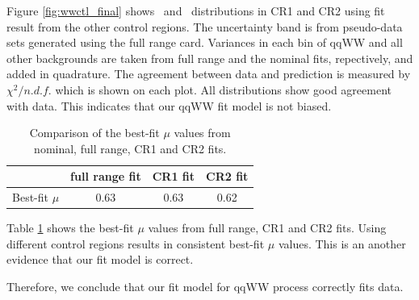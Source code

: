Figure \ref{fig:wwctl_final} shows \mt~and \mll~distributions in CR1 and CR2 using 
fit result from the other control regions. The uncertainty band is from pseudo-data 
sets generated using the full range card. Variances in each bin of qqWW and all other 
backgrounds are taken from full range and the nominal fits, repectively, and added in quadrature. 
The agreement between data and prediction is measured by $\chi^2/n.d.f.$ which is 
shown on each plot. All distributions show good agreement with data.
This indicates that our qqWW fit model is not biased.
%
\begin{table}
\begin{center}
\begin{tabular}{c|ccc}
\hline
                    & full range fit    & CR1 fit   & CR2 fit   \\
\hline
Best-fit $\mu$      & 0.63              & 0.63      & 0.62      \\
\hline
\end{tabular}
\end{center}
\caption{Comparison of the best-fit $\mu$ values from nominal, full range, CR1 and CR2 fits.} 
\label{tab:bestfitmu_compare}
\end{table}
Table \ref{tab:bestfitmu_compare} shows the best-fit $\mu$ values from full range, 
CR1 and CR2 fits. Using different control regions results in consistent best-fit $\mu$ values. 
This is an another evidence that our fit model is correct. 

Therefore, we conclude that our fit model for qqWW process correctly fits data.  
